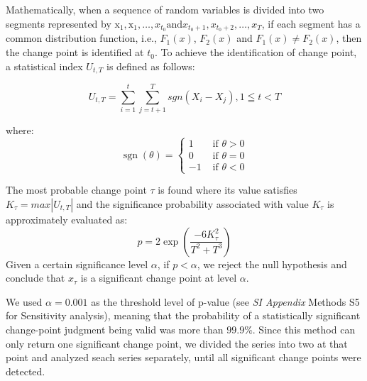 		Mathematically, when a sequence of random variables is divided into two segments represented by $\mathrm{x}_{1}, \mathrm{x}_{1}, \ldots, x_{t_{0}} \text{and} x_{t_{0}+1}, x_{t_{0}+2}, \ldots, x_{T}$, if each segment has a common distribution function, i.e., $F_1(x)$, $F_2(x)$ and $F_1(x) \neq F_2(x)$, then the change point is identified at $t_0$. To achieve the identification of change point, a statistical index $U_{t,T}$ is defined as follows:

		\begin{equation}
			U_{t, T} = \sum_{i=1}^t\sum_{j=t+1}^T sgn(X_i - X_j), 1 \leqq t < T
		\end{equation}

		where:
		\begin{equation}
			\operatorname{sgn}(\theta)= \begin{cases}1 & \text { if } \theta>0 \\ 0 & \text { if } \theta=0 \\ -1 & \text { if } \theta<0\end{cases}
		\end{equation}

		The most probable change point $\tau$ is found where its value satisfies $K_{\tau} = max|U_{t, T}|$ and the significance probability associated with value $K_{\tau}$ is approximately evaluated as:
		\begin{equation}
			p=2 \exp \left(\frac{-6 K_{\tau}^{2}}{T^{2}+T^{3}}\right)
		\end{equation}
		Given a certain significance level $\alpha$, if $p < \alpha$, we reject the null hypothesis and conclude that $x_{\tau}$ is a significant change point at level $\alpha$.

		We used $\alpha = 0.001$ as the threshold level of p-value (see \textit{SI Appendix} Methods S5 for Sensitivity analysis), meaning that the probability of a statistically significant change-point judgment being valid was more than $99.9\%$.
		Since this method can only return one significant change point, we divided the series into two at that point and analyzed seach series separately, until all significant change points were detected.

